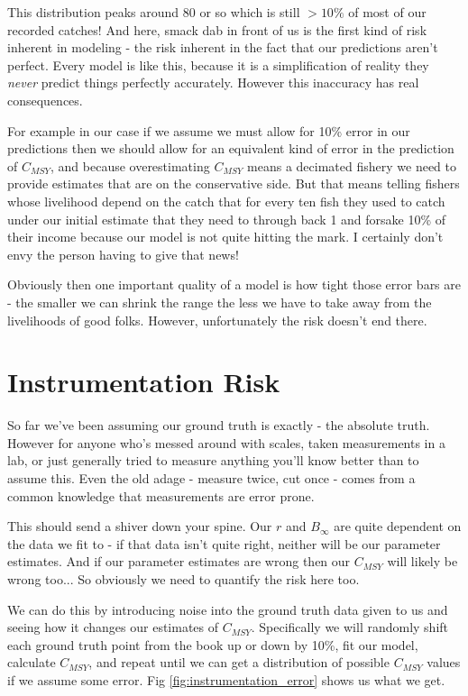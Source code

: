 \documentclass[11pt,a5paper]{book}
\begin{document}
This distribution peaks around 80 or so which is still $>10\%$ of most of our recorded catches! And here, smack dab in front of us is the first kind of risk inherent in modeling - the risk inherent in the fact that our predictions aren't perfect. Every model is like this, because it is a simplification of reality they \textit{never} predict things perfectly accurately. However this inaccuracy has real consequences. 
\newline

For example in our case if we assume we must allow for 10\% error in our predictions then we should allow for an equivalent kind of error in the prediction of $C_{MSY}$, and because overestimating $C_{MSY}$ means a decimated fishery we need to provide estimates that are on the conservative side. But that means telling fishers whose livelihood depend on the catch that for every ten fish they used to catch under our initial estimate that they need to through back 1 and forsake 10\% of their income because our model is not quite hitting the mark. I certainly don't envy the person having to give that news! 
\newline

Obviously then one important quality of a model is how tight those error bars are - the smaller we can shrink the range the less we have to take away from the livelihoods of good folks. However, unfortunately the risk doesn't end there. 

\section{Instrumentation Risk}

So far we've been assuming our ground truth is exactly - the absolute truth. However for anyone who's messed around with scales, taken measurements in a lab, or just generally tried to measure anything you'll know better than to assume this. Even the old adage - measure twice, cut once - comes from a common knowledge that measurements are error prone. 
\newline

This should send a shiver down your spine. Our $r$ and $B_\infty$ are quite dependent on the data we fit to - if that data isn't quite right, neither will be our parameter estimates. And if our parameter estimates are wrong then our $C_{MSY}$ will likely be wrong too... So obviously we need to quantify the risk here too. 
\newline

We can do this by introducing noise into the ground truth data given to us and seeing how it changes our estimates of $C_{MSY}$. Specifically we will randomly shift each ground truth point from the book up or down by 10\%, fit our model, calculate $C_{MSY}$, and repeat until we can get a distribution of possible $C_{MSY}$ values if we assume some error. Fig \ref{fig:instrumentation_error} shows us what we get.
\newline
\end{document}
